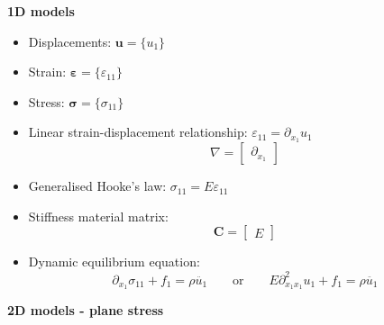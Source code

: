 \documentclass[12pt]{article}
\title{}
\author{Stefano Burzio}
\date{}
\begin{document}
\hrulefill
\vspace{0.3cm}

\hspace*{\fill}\textbf{\Large 1D models}\hspace*{\fill}

\hrulefill
\begin{itemize}
      \item Displacements: $\mathbf u =\{u_{1}\}$
      \item Strain:  $\boldsymbol\varepsilon =\{\varepsilon_{11}\}$
      \item Stress: $\boldsymbol\sigma =\{\sigma_{11}\}$

      \item Linear strain-displacement relationship: $\varepsilon_{11}=\partial_{x_1}u_{1}$
            $$\nabla=\begin{bmatrix} \partial_{x_1}  \end{bmatrix}$$
      \item Generalised Hooke’s law: $\sigma_{11}=E\varepsilon_{11}$
      \item Stiffness material matrix: $$\mathbf C=\begin{bmatrix} E \end{bmatrix}$$
      \item Dynamic equilibrium equation:
            $$ \partial_{x_1}\sigma_{11} + f_1 = \rho \ddot{u_{1}}\qquad \text{or}\qquad E \partial^2_{x_1x_1}u_{1}+ f_1 = \rho \ddot{u_{1}}$$
\end{itemize}

\hrulefill
\vspace{0.3cm}

\hspace*{\fill}\textbf{\Large 2D models - plane stress}\hspace*{\fill}

\hrulefill
\end{document}
